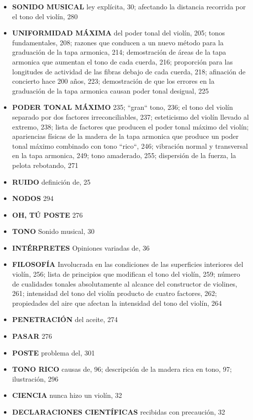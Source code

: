 \documentclass[12pt]{book}
\begin{document}
\begin{itemize}
    \item \textbf{SONIDO MUSICAL} ley explícita, 30; afectando la distancia recorrida por el tono del violín, 280
    \item \textbf{UNIFORMIDAD MÁXIMA} del poder tonal del violín, 205; tonos fundamentales, 208; razones que conducen a un nuevo método para la graduación de la tapa armonica, 214; demostración de áreas de la tapa armonica que aumentan el tono de cada cuerda, 216; proporción para las longitudes de actividad de las fibras debajo de cada cuerda, 218; afinación de concierto hace 200 años, 223; demostración de que los errores en la graduación de la tapa armonica causan poder tonal desigual, 225
    \item \textbf{PODER TONAL MÁXIMO} 235; ``gran`` tono, 236; el tono del violín separado por dos factores irreconciliables, 237; esteticismo del violín llevado al extremo, 238; lista de factores que producen el poder tonal máximo del violín; apariencias físicas de la madera de la tapa armonica que produce un poder tonal máximo combinado con tono ``rico``, 246; vibración normal y transversal en la tapa armonica, 249; tono amaderado, 255; dispersión de la fuerza, la pelota rebotando, 271
    \item \textbf{RUIDO} definición de, 25
    \item \textbf{NODOS} 294
    \item \textbf{OH, TÚ POSTE} 276
    \item \textbf{TONO} Sonido musical, 30
    \item \textbf{INTÉRPRETES} Opiniones variadas de, 36
    \item \textbf{FILOSOFÍA} Involucrada en las condiciones de las superficies interiores del violín, 256; lista de principios que modifican el tono del violín, 259; número de cualidades tonales absolutamente al alcance del constructor de violines, 261; intensidad del tono del violín producto de cuatro factores, 262; propiedades del aire que afectan la intensidad del tono del violín, 264
    \item \textbf{PENETRACIÓN} del aceite, 274
    \item \textbf{PASAR} 276
    \item \textbf{POSTE} problema del, 301
    \item \textbf{TONO RICO} causas de, 96; descripción de la madera rica en tono, 97; ilustración, 296
    \item \textbf{CIENCIA} nunca hizo un violín, 32
    \item \textbf{DECLARACIONES CIENTÍFICAS} recibidas con precaución, 32

\end{itemize}
\end{document}
